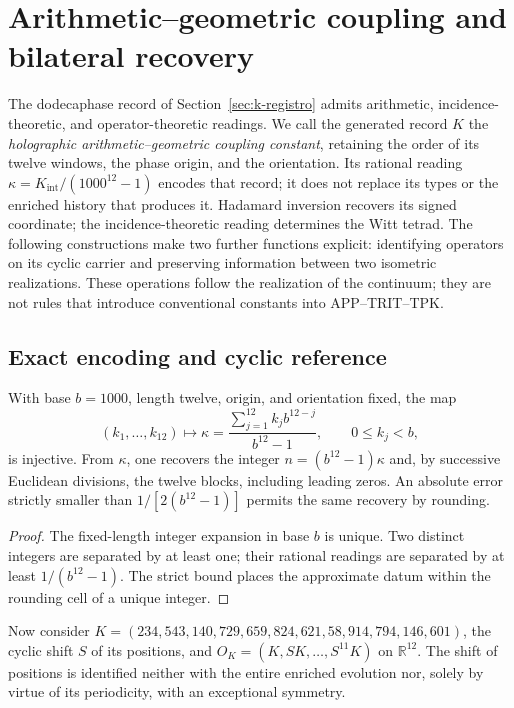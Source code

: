 \section{Arithmetic--geometric coupling and bilateral recovery}
\label{sec:acoplamiento-recuperacion}

The dodecaphase record of Section~\ref{sec:k-registro} admits
arithmetic, incidence-theoretic, and operator-theoretic readings. We call
the generated record \(K\) the
\emph{holographic arithmetic--geometric coupling constant}, retaining
the order of its twelve windows, the phase origin, and the orientation.
Its rational reading
\(\kappa=K_{\mathrm{int}}/(1000^{12}-1)\) encodes that
record; it does not replace its types or the enriched history that produces it.
Hadamard inversion recovers its signed coordinate; the incidence-theoretic
reading determines the Witt tetrad. The following constructions
make two further functions explicit: identifying operators on its cyclic
carrier and preserving information between two isometric realizations.
These operations follow the realization of the continuum; they are not rules
that introduce conventional constants into APP--TRIT--TPK.

\subsection{Exact encoding and cyclic reference}
\label{subsec:acoplamiento-codigo}

\begin{proposition}
With base \(b=1000\), length twelve, origin, and orientation fixed, the map
\[
 (k_1,\ldots,k_{12})\longmapsto
 \kappa=\frac{\sum_{j=1}^{12}k_jb^{12-j}}{b^{12}-1},
 \qquad 0\leq k_j<b,
\]
is injective. From \(\kappa\), one recovers the integer
\(n=(b^{12}-1)\kappa\) and, by successive Euclidean divisions, the twelve
blocks, including leading zeros. An absolute error strictly
smaller than \(1/[2(b^{12}-1)]\) permits the same recovery by rounding.
\end{proposition}
\begin{proof}
The fixed-length integer expansion in base \(b\) is unique. Two distinct
integers are separated by at least one; their rational readings
are separated by at least \(1/(b^{12}-1)\). The strict bound places
the approximate datum within the rounding cell of a unique integer.
\end{proof}

Now consider \(K=(234,543,140,729,659,824,621,58,914,794,146,601)\),
the cyclic shift \(S\) of its positions, and
\(O_K=(K,SK,\ldots,S^{11}K)\) on \(\mathbb R^{12}\).
The shift of positions is identified neither with the entire enriched
evolution nor, solely by virtue of its periodicity, with an exceptional symmetry.

